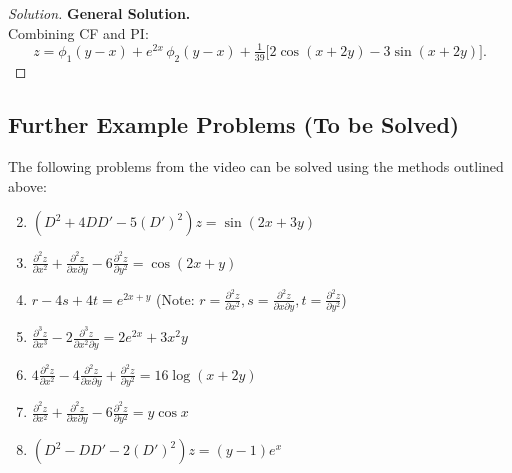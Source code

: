 \documentclass{article}
\theoremstyle{remark}
\begin{document}
\begin{proof}[Solution]
		\medskip
		\textbf{General Solution.}\\
		Combining CF and PI:
		\[
		\boxed{
			z = \phi_1(y - x)
			+ e^{2x}\,\phi_2(y - x)
			+ \tfrac1{39}\bigl[2\cos(x+2y) - 3\sin(x+2y)\bigr]
		}.
		\]
	\end{proof}
	
	\subsection{Further Example Problems (To be Solved)}
	The following problems from the video can be solved using the methods outlined above:
	\begin{enumerate}
		\setcounter{enumi}{1} %
		\item $(D^2 + 4DD' - 5(D')^2) z = \sin(2x + 3y)$
		\item $\frac{\partial^2 z}{\partial x^2} + \frac{\partial^2 z}{\partial x \partial y} - 6 \frac{\partial^2 z}{\partial y^2} = \cos(2x + y)$
		\item $r - 4s + 4t = e^{2x+y}$ (Note: $r=\frac{\partial^2 z}{\partial x^2}, s=\frac{\partial^2 z}{\partial x \partial y}, t=\frac{\partial^2 z}{\partial y^2}$)
		\item $\frac{\partial^3 z}{\partial x^3} - 2 \frac{\partial^3 z}{\partial x^2 \partial y} = 2e^{2x} + 3x^2y$
		\item $4\frac{\partial^2 z}{\partial x^2} - 4\frac{\partial^2 z}{\partial x \partial y} + \frac{\partial^2 z}{\partial y^2} = 16 \log(x + 2y)$
		\item $\frac{\partial^2 z}{\partial x^2} + \frac{\partial^2 z}{\partial x \partial y} - 6 \frac{\partial^2 z}{\partial y^2} = y \cos x$
		\item $(D^2 - DD' - 2(D')^2) z = (y-1)e^x$
	\end{enumerate}
	
\end{document}
